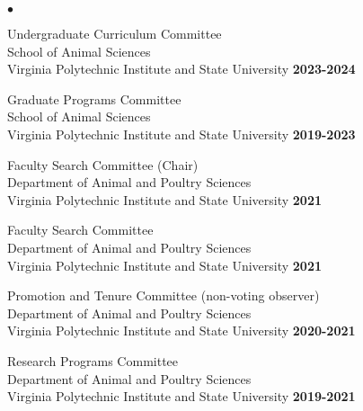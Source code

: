 \documentclass[margin,line,10pt]{res}
\newenvironment{list2}{
  \begin{list}{$\bullet$}{%
      \setlength{\itemsep}{0in}
      \setlength{\parsep}{0in} \setlength{\parskip}{0in}
      \setlength{\topsep}{0in} \setlength{\partopsep}{0in} 
      \setlength{\leftmargin}{0.2in}}}{\end{list}}
\begin{document}
\begin{resume}
\begin{list2}
  \item Undergraduate Curriculum Committee \\
  School of Animal Sciences \\ Virginia Polytechnic Institute and State University   \hfill \textbf{2023-2024}\\

  \vspace{0.3cm}

  \item Graduate Programs Committee \\
  School of Animal Sciences \\ Virginia Polytechnic Institute and State University   \hfill \textbf{2019-2023}\\

  \vspace{0.3cm}

  \item Faculty Search Committee (Chair) \\
  Department of Animal and Poultry Sciences \\ Virginia Polytechnic Institute and State University   \hfill \textbf{2021}\\

  
  \vspace{0.3cm}

   \item  Faculty Search Committee \\
  Department of Animal and Poultry Sciences \\ Virginia Polytechnic Institute and State University   \hfill \textbf{2021}\\

      \vspace{0.3cm}
  
\item Promotion and Tenure Committee (non-voting observer) \\
  Department of Animal and Poultry Sciences \\ Virginia Polytechnic Institute and State University   \hfill \textbf{2020-2021}\\

    \vspace{0.3cm}

  
\item Research Programs Committee \\
  Department of Animal and Poultry Sciences \\ Virginia Polytechnic Institute and State University  \hfill \textbf{2019-2021}\\


\end{list2}
\end{resume}
\end{document}
